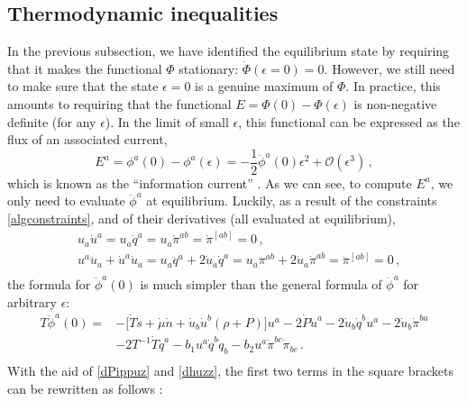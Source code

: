 \documentclass[a4paper, amsfonts, amssymb, amsmath, reprint, showkeys, nofootinbib, twoside, onecolumn, notitlepage]{revtex4-1}
\theoremstyle{definition}
\theoremstyle{theorem}
\begin{document}
\subsection{Thermodynamic inequalities}

In the previous subsection, we have identified the equilibrium state by requiring that it makes the functional $\Phi$ stationary: $\dot{\Phi}(\epsilon=0)=0$. However, we still need to make sure that the state $\epsilon=0$ is a genuine maximum of $\Phi$. In practice, this amounts to requiring that the functional $E=\Phi(0)-\Phi(\epsilon)$ is non-negative definite (for any $\epsilon$). In the limit of small $\epsilon$, this functional can be expressed as the flux of an associated current,
\begin{equation}
E^a = \phi^a(0)-\phi^a(\epsilon) = -\dfrac{1}{2}\ddot{\phi}^a(0) \epsilon^2 + \mathcal{O}(\epsilon^3) \, ,
\end{equation} 
which is known as the ``information current'' \cite{GavassinoCausality2021}. As we can see, to compute $E^a$, we only need to evaluate $\ddot{\phi}^a$ at equilibrium. Luckily, as a result of the constraints \eqref{algconstraints}, and of their derivatives (all evaluated at equilibrium),
\begin{equation}
\begin{split}
& u_a \dot{u}^a=u_a \dot{q}^a= u_a \dot{\pi}^{ab}=\dot{\pi}^{[ab]}=0 \, ,\\
& u^a \ddot{u}_a +\dot{u}^a \dot{u}_a =  u_a \ddot{q}^a+2\dot{u}_a \dot{q}^a=u_a \ddot{\pi}^{ab} + 2\dot{u}_a \dot{\pi}^{ab}=\ddot{\pi}^{[ab]}=0 \, , \\
\end{split}
\end{equation}
the formula for $\ddot{\phi}^a(0)$ is much simpler than the general formula of $\ddot{\phi}^a$ for arbitrary $\epsilon$:
\begin{equation}
\begin{split}
T\ddot{\phi}^a(0) ={ } & -\big[ \dot{T} \dot{s}+\dot{\mu} \dot{n}   + \dot{u}_b \dot{u}^b (\rho+P)\big]u^a 
-2 \dot{P}\dot{u}^a -2\dot{u}_b \dot{q}^b u^a- 2\dot{u}_b \dot{\pi}^{ba} \\
& -2T^{-1}\dot{T} \dot{q}^a  - b_1 u^a \dot{q}^b \dot{q}_b    -b_2 u^a \dot{\pi}^{bc}\dot{\pi}_{bc}  \, . \\
\end{split}
\end{equation}
With the aid of \eqref{dPippuz} and \eqref{dhuzz}, the first two terms in the square brackets can be rewritten as follows \cite{GavassinoCausality2021}:
\end{document}
